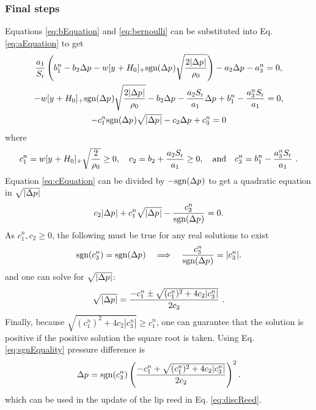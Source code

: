\subsubsection{Final steps}
Equations \eqref{eq:bEquation} and \eqref{eq:bernoulli} can be substituted into Eq. \eqref{eq:aEquation} to get
\begin{gather}
    \frac{a_1}{S_\text{r}}\left(b_1^n - b_2\Delta p^{} - w[y^{}+H_0]_+\text{sgn}(\Delta p^{})\sqrt{\frac{2|\Delta p^{}|}{\rho_0}}\right) - a_2 \Delta p^{} - a_3^n = 0,\nonumber\\
    - w[y^{}+H_0]_+\text{sgn}(\Delta p^{})\sqrt{\frac{2|\Delta p^{}|}{\rho_0}} - b_2\Delta p^{} - \frac{a_2S_\text{r}}{a_1} \Delta p^{} + b_1^n - \frac{a_3^nS_\text{r}}{a_1} = 0,\nonumber\\
    -c_1^n\text{sgn}(\Delta p^{})\sqrt{|\Delta p^{}|} - c_2\Delta p^{} + c_3^n = 0\label{eq:cEquation}
\end{gather}
where
\begin{equation}\label{eq:cCoeffs}
    c_1^n = w[y^{} + H_0]_+\sqrt{\frac{2}{\rho_0}} \geq 0, \quad c_2 = b_2 + \frac{a_2S_\text{r}}{a_1} \geq 0, \quad \text{and}\quad c_3^n = b_1^n - \frac{a_3^nS_\text{r}}{a_1}\ .
\end{equation}
Equation \eqref{eq:cEquation} can be divided by $-\text{sgn}(\Delta p^{})$ to get a quadratic equation in $\sqrt{|\Delta p^{}|}$
\begin{equation}
    c_2|\Delta p^{}| + c_1^n\sqrt{|\Delta p^{}|} - \frac{c_3^n}{\text{sgn}(\Delta p^{})} = 0.
\end{equation}
As $c_1^n, c_2 \geq 0$, the following must be true for any real solutions to exist
\begin{equation}\label{eq:sgnEquality}
    \text{sgn}(c_3^n) = \text{sgn}(\Delta p^{}) \quad \Longrightarrow \quad \frac{c_3^n}{\text{sgn}(\Delta p^{})} = |c_3^n|.
\end{equation}
and one can solve for $\sqrt{|\Delta p^{}|}$:
\begin{equation}
    \sqrt{|\Delta p^{}|} = \frac{-c_1^n \pm \sqrt{(c^n_1)^2+4c_2|c_3^n|}}{2c_2}\ .
\end{equation}
Finally, because $\sqrt{(c_1^n)^2 + 4c_2|c_3^n|} \geq c_1^n$, one can guarantee that the solution is positive if the positive solution the square root is taken. Using Eq. \eqref{eq:sgnEquality} pressure difference is
\begin{equation}\label{eq:pressureDiff}
    \Delta p^{} = \text{sgn}(c_3^n)\left(\frac{-c_1^n + \sqrt{(c^n_1)^2+4c_2|c_3^n|}}{2c_2}\right)^2.
\end{equation}
which can be used in the update of the lip reed in Eq. \eqref{eq:discReed}. 


